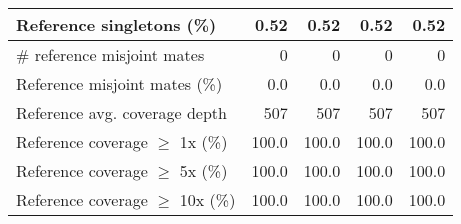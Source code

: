 \documentclass[12pt,a4paper]{article}
\begin{document}
\begin{table}[ht]
\begin{center}
\begin{tabular}{|l*{4}{|r}|}
Reference singletons (\%) & 0.52 & 0.52 & 0.52 & 0.52 \\ \hline
\# reference misjoint mates & 0 & 0 & 0 & 0 \\ \hline
Reference misjoint mates (\%) & 0.0 & 0.0 & 0.0 & 0.0 \\ \hline
Reference avg. coverage depth & 507 & 507 & 507 & 507 \\ \hline
Reference coverage $\geq$ 1x (\%) & 100.0 & 100.0 & 100.0 & 100.0 \\ \hline
Reference coverage $\geq$ 5x (\%) & 100.0 & 100.0 & 100.0 & 100.0 \\ \hline
Reference coverage $\geq$ 10x (\%) & 100.0 & 100.0 & 100.0 & 100.0 \\ \hline
\end{tabular}
\end{center}
\end{table}
\end{document}
